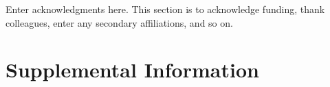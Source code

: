 \documentclass[draft]{agujournal2019}
\begin{document}
\acknowledgments
Enter acknowledgments here. This section is to acknowledge funding, thank colleagues, enter any secondary affiliations, and so on.

\section*{Supplemental Information}



%
%

%



%
%
%
%
%


\end{document}
